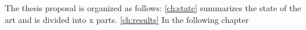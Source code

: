 \begin{table}[h]

	\centering

\caption{Technologies and features that the competition candidates offer.}
\label{tab:svcomp}
\end{table}




The thesis proposal is organized as follows: \autoref{ch:state} summarizes the state of the art and is divided into {\color{red}x} parts. \autoref{ch:results}
In the following chapter

